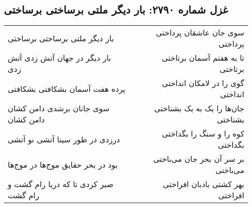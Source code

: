 \begin{center}
\section*{غزل شماره ۲۷۹۰: بار دیگر ملتی برساختی برساختی}
\label{sec:2790}
\begin{longtable}{l p{0.5cm} r}
بار دیگر ملتی برساختی برساختی
&&
سوی جان عاشقان پرداختی پرداختی
\\
بار دیگر در جهان آتش زدی آتش زدی
&&
تا به هفتم آسمان برتاختی برتاختی
\\
پرده هفت آسمان بشکافتی بشکافتی
&&
گوی را در لامکان انداختی انداختی
\\
سوی جانان برشدی دامن کشان دامن کشان
&&
جان‌ها را یک به یک بشناختی بشناختی
\\
درزدی در طور سینا آتشی نو آتشی
&&
کوه را و سنگ را بگداختی بگداختی
\\
بود در بحر حقایق موج‌ها در موج‌ها
&&
بر سر آن بحر جان می‌باختی می‌باختی
\\
صبر کردی تا که دریا رام گشت و رام گشت
&&
بهر کشتی بادبان افراختی افراختی
\\
\end{longtable}
\end{center}
